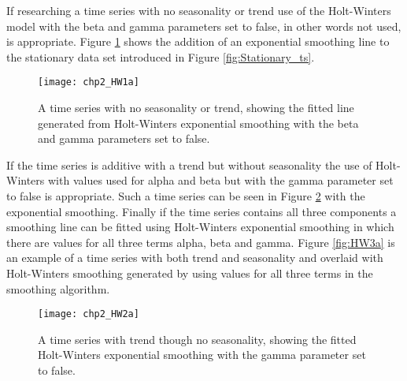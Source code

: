 If researching a time series with no seasonality or trend use of the Holt-Winters model with the beta and gamma parameters set to false, in other words not used, is appropriate. Figure \ref{fig:HW1a} shows the addition of an exponential smoothing line to the stationary data set introduced in Figure \ref{fig:Stationary_ts}.


\begin{figure}[tbph!]
\centering
\texttt{[image: chp2\_HW1a]}
\caption[Exponential smoothing of a time series with no seasonality or trend]{A time series with no seasonality or trend, showing the fitted line generated from Holt-Winters exponential smoothing with the beta and gamma parameters set to false.}
\label{fig:HW1a}
\end{figure}

If the time series is additive with a trend but without seasonality the use of Holt-Winters with values used for alpha and beta but with the gamma parameter set to false is appropriate. Such a time series can be seen in Figure \ref{fig:HW2a} with the exponential smoothing. Finally if the time series contains all three components a smoothing line can be fitted using Holt-Winters exponential smoothing in which there are values for all three terms alpha, beta and gamma. Figure \ref{fig:HW3a} is an example of a time series with both trend and seasonality and overlaid with Holt-Winters smoothing generated by using values for all three terms in the smoothing algorithm.


\begin{figure}[tbph!]
\centering
\texttt{[image: chp2\_HW2a]}
\caption[Exponential smoothing of a time series with trend though no seasonality]{A time series with trend though no seasonality, showing the fitted Holt-Winters exponential smoothing with the gamma parameter set to false.}
\label{fig:HW2a}
\end{figure}

